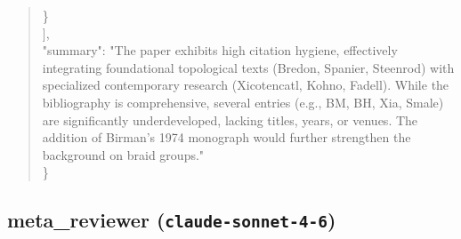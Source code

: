 \documentclass[11pt]{article}
\begin{document}
\begin{quote}
    \}\\
  ],\\
  "summary": "The paper exhibits high citation hygiene, effectively integrating foundational topological texts (Bredon, Spanier, Steenrod) with specialized contemporary research (Xicotencatl, Kohno, Fadell). While the bibliography is comprehensive, several entries (e.g., BM, BH, Xia, Smale) are significantly underdeveloped, lacking titles, years, or venues. The addition of Birman's 1974 monograph would further strengthen the background on braid groups."\\
\}\\
\end{quote}

\subsection*{meta\_reviewer (\texttt{claude-sonnet-4-6})}
\end{document}
